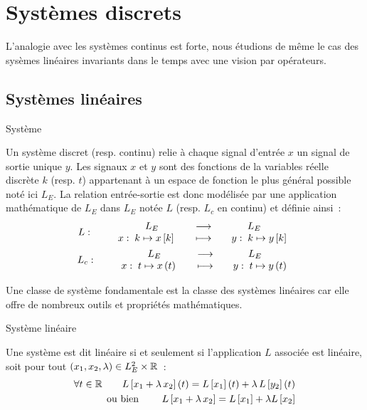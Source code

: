 \chapter{Systèmes discrets}


L'analogie avec les systèmes continus est forte, nous étudions de même
le cas des sysèmes linéaires invariants dans le temps avec une vision
par opérateurs.


\section{Systèmes linéaires}

\begin{definition}{Système}
  
  Un système discret (resp. continu) relie à chaque signal d'entrée $x$
  un signal de sortie unique $y$. Les signaux $x$ et $y$ sont des
  fonctions de la variables réelle discrète $k$ (resp. $t$) appartenant
  à un espace de fonction le plus général possible noté ici $L_E$. La
  relation entrée-sortie est donc modélisée par une application
  mathématique de $L_E$ dans $L_E$ notée $L$ (resp. $L_c$ en continu) et
  définie ainsi~:
  \begin{eqnarray}
    L : \qquad \begin{array}{ccc} L_E & \longrightarrow & L_E \\ x : \; k\mapsto x\left[k\right]\quad{} & \longmapsto & \quad y :\; k\mapsto y\left[k\right] \\ \end{array} \\
    L_c: \qquad \begin{array}{ccc} L_E & \longrightarrow & L_E \\ x : \; t\mapsto x\left(t\right)\quad{} & \longmapsto & \quad y :\; t\mapsto y\left(t\right) \\ \end{array} 
  \end{eqnarray}
\end{definition}

Une classe de système fondamentale est la classe des systèmes
linéaires car elle offre de nombreux outils et propriétés
mathématiques.

\begin{definition}{Système linéaire}
  \label{def:linearite}
  
  Une système est dit linéaire si et seulement si
  l'application $L$ associée est linéaire, soit pour tout
  $\left(x_1,x_2,\lambda\right) \in L_E^2 \times \mathbb{R}$~:
  \begin{eqnarray}
    \label{eq:def_linearite}
    \forall t \in \mathbb{R} \qquad L\left[x_1 + \lambda\, x_2\right](t) = L\left[x_1\right](t) + \lambda\,L\left[y_2\right](t) \nonumber\\
    \text{ou bien } \qquad L\left[x_1 + \lambda\,x_2\right] = L\left[x_1\right] +\lambda L\left[x_2 \right]
  \end{eqnarray}
\end{definition}

